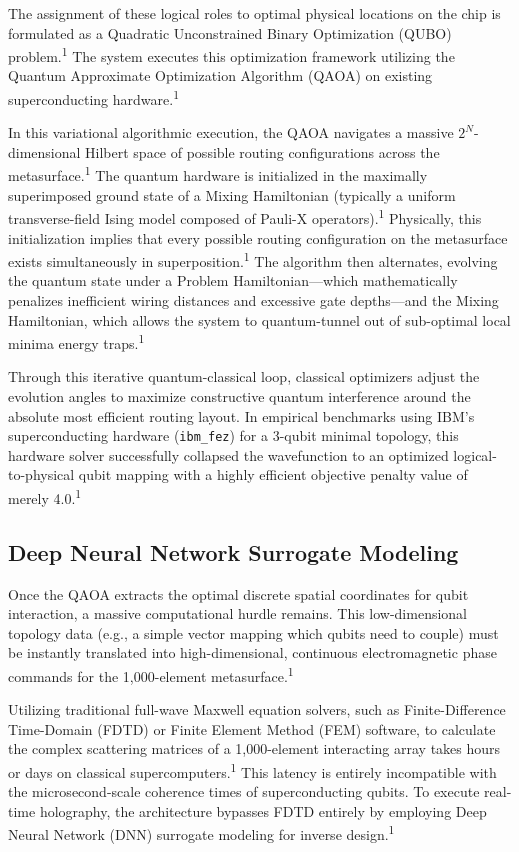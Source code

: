 \documentclass[11pt, a4paper]{article}
\begin{document}
The assignment of these logical roles to optimal physical locations on the chip is formulated as a Quadratic Unconstrained Binary Optimization (QUBO) problem.\textsuperscript{1} The system executes this optimization framework utilizing the Quantum Approximate Optimization Algorithm (QAOA) on existing superconducting hardware.\textsuperscript{1}

In this variational algorithmic execution, the QAOA navigates a massive $2^N$-dimensional Hilbert space of possible routing configurations across the metasurface.\textsuperscript{1} The quantum hardware is initialized in the maximally superimposed ground state of a Mixing Hamiltonian (typically a uniform transverse-field Ising model composed of Pauli-X operators).\textsuperscript{1} Physically, this initialization implies that every possible routing configuration on the metasurface exists simultaneously in superposition.\textsuperscript{1} The algorithm then alternates, evolving the quantum state under a Problem Hamiltonian---which mathematically penalizes inefficient wiring distances and excessive gate depths---and the Mixing Hamiltonian, which allows the system to quantum-tunnel out of sub-optimal local minima energy traps.\textsuperscript{1}

Through this iterative quantum-classical loop, classical optimizers adjust the evolution angles to maximize constructive quantum interference around the absolute most efficient routing layout. In empirical benchmarks using IBM's superconducting hardware (\texttt{ibm\_fez}) for a 3-qubit minimal topology, this hardware solver successfully collapsed the wavefunction to an optimized logical-to-physical qubit mapping with a highly efficient objective penalty value of merely 4.0.\textsuperscript{1}

\subsection*{Deep Neural Network Surrogate Modeling}

Once the QAOA extracts the optimal discrete spatial coordinates for qubit interaction, a massive computational hurdle remains. This low-dimensional topology data (e.g., a simple vector mapping which qubits need to couple) must be instantly translated into high-dimensional, continuous electromagnetic phase commands for the 1,000-element metasurface.\textsuperscript{1}

Utilizing traditional full-wave Maxwell equation solvers, such as Finite-Difference Time-Domain (FDTD) or Finite Element Method (FEM) software, to calculate the complex scattering matrices of a 1,000-element interacting array takes hours or days on classical supercomputers.\textsuperscript{1} This latency is entirely incompatible with the microsecond-scale coherence times of superconducting qubits. To execute real-time holography, the architecture bypasses FDTD entirely by employing Deep Neural Network (DNN) surrogate modeling for inverse design.\textsuperscript{1}
\end{document}
